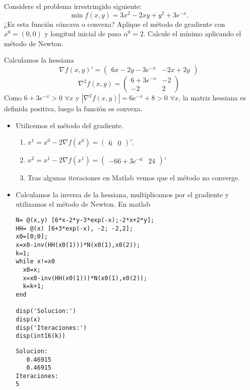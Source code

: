 \documentclass[twoside]{article}
\begin{document}
\newpage
\begin{ejercicio}{5}
Considere el problema irrestringido siguiente:
$$\min f(x,y)=3x^2-2xy+y^2+3e^{-x}.$$
¿Es esta función cóncava o convexa? Aplique el método de gradiente con $x^0=(0,0)$ y longitud inicial de paso $\alpha^0=2$. Calcule el mínimo aplicando el método de Newton. 
\end{ejercicio}
\begin{solucion}
Calculamos la hessiana
$$
\nabla f(x,y)' = \begin{pmatrix}
6x-2y -3e^{-x} & -2x+2y
\end{pmatrix} 
$$
$$
\nabla^2 f(x,y) = \begin{pmatrix}
6 +3e^{-x} & -2\\
-2 & 2
\end{pmatrix} 
$$
Como $6+3e^{-x}>0$ $\forall x$ y $|\nabla^2f(x,y)|=6e^{-x}+8>0$ $\forall x$, la matriz hessiana es definida positiva, luego la función es convexa.
\begin{itemize}
\item Utilicemos el método del gradiente.
\begin{enumerate}
\item $x^1 = x^0 - 2\nabla f(x^0) = \begin{pmatrix}
6 & 0
\end{pmatrix}' $.
\item $x^2=x^1-2\nabla f(x^1) =  
\begin{pmatrix}
-66 +3e^{-6} & 24
\end{pmatrix}' $
\item Tras algunas iteraciones en Matlab vemos que el método no converge.
\end{enumerate}
\item Calculamos la inversa de la hessiana, multiplicamos por el gradiente y utilizamos el método de Newton. En matlab
\begin{verbatim}
N= @(x,y) [6*x-2*y-3*exp(-x);-2*x+2*y];
HH= @(x) [6+3*exp(-x), -2; -2,2];
x0=[0;0];
x=x0-inv(HH(x0(1)))*N(x0(1),x0(2));
k=1;
while x!=x0
  x0=x;
  x=x0-inv(HH(x0(1)))*N(x0(1),x0(2));
  k=k+1;
end

disp('Solucion:')
disp(x)
disp('Iteraciones:')
disp(int16(k))
\end{verbatim}
\begin{verbatim}
Solucion:
   0.46915
   0.46915
Iteraciones:
5
\end{verbatim}
\end{itemize}
\end{solucion}
\end{document}
